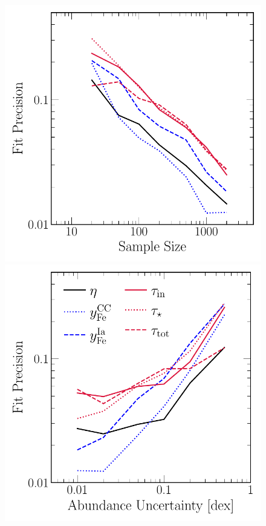 \documentclass[ms.tex]{subfiles}
\begin{document}
\begin{itemize}
\begin{figure}
\centering
\includegraphics[scale = 0.52]{precision_samplesize.pdf}
\includegraphics[scale = 0.52]{precision_abundanceuncertainty.pdf}

\end{figure}
\end{itemize}
\end{document}
